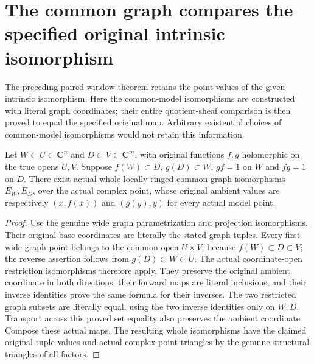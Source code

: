 \section{The common graph compares the specified original intrinsic isomorphism}

The preceding paired-window theorem retains the point values of the given
intrinsic isomorphism. Here the common-model isomorphisms are constructed with
literal graph coordinates; their entire quotient-sheaf comparison is then
proved to equal the specified original map. Arbitrary existential choices of
common-model isomorphisms would not retain this information.

\begin{theorem}
\label{hir:actual-common-graph-isos-literal-coordinates}
\leanok
Let $W\subset U\subset\mathbf C^n$ and $D\subset V\subset\mathbf C^m$,
with original functions $f,g$ holomorphic on the true opens $U,V$.
Suppose $f(W)\subset D$, $g(D)\subset W$, $gf=1$ on $W$ and $fg=1$ on
$D$. There exist actual whole locally ringed common-graph isomorphisms
$E_W,E_D$, over the actual complex point, whose original ambient values
are respectively $(x,f(x))$ and $(g(y),y)$ for every actual model point.
\end{theorem}
\begin{proof}
Use the genuine wide graph parametrization and projection isomorphisms.
Their original base coordinates are literally the stated graph tuples.
Every first wide graph point belongs to the common open $U\times V$,
because $f(W)\subset D\subset V$; the reverse assertion follows from
$g(D)\subset W\subset U$. The actual coordinate-open restriction
isomorphisms therefore apply. They preserve the original ambient coordinate
in both directions: their forward maps are literal inclusions, and their
inverse identities prove the same formula for their inverses. The two
restricted graph subsets are literally equal, using the two inverse
identities only on $W,D$. Transport across this proved set equality also
preserves the ambient coordinate. Compose these actual maps. The resulting
whole isomorphisms have the claimed original tuple values and actual
complex-point triangles by the genuine structural triangles of all factors.
\end{proof}

